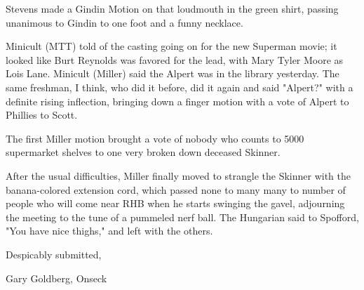 \documentclass[12pt]{article}
\begin{document}
Stevens made a Gindin Motion on that loudmouth in the green shirt, passing unanimous to Gindin to one foot and a funny necklace.

Minicult (MTT) told of the casting going on for the new Superman movie; it looked like Burt Reynolds was favored for the lead, with Mary Tyler Moore as Lois Lane. Minicult (Miller) said the Alpert was in the library yesterday. The same freshman, I think, who did it before, did it again and said "Alpert?" with a definite rising inflection, bringing down a finger motion with a vote of Alpert to Phillies to Scott.

The first Miller motion brought a vote of nobody who counts to 5000 supermarket shelves to one very broken down deceased Skinner.

After the usual difficulties, Miller finally moved to strangle the Skinner with the banana-colored extension cord, which passed none to many many to number of people who will come near RHB when he starts swinging the gavel, adjourning the meeting to the tune of a pummeled nerf ball. The Hungarian said to Spofford, "You have nice thighs," and left with the others.

\vspace{12pt}

\centerline{Despicably submitted,}
\centerline{Gary Goldberg, Onseck}
\end{document}
